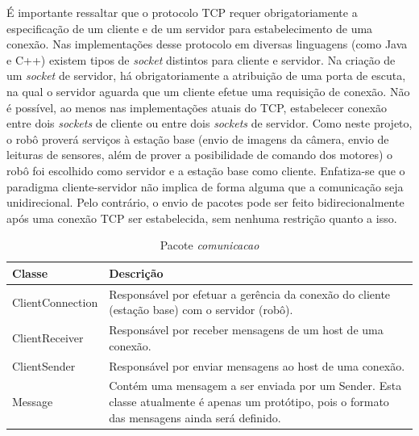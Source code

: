 É importante ressaltar que o protocolo TCP requer obrigatoriamente a especificação de um cliente e de um servidor para estabelecimento de uma conexão. Nas implementações desse protocolo em diversas linguagens (como Java e C++) existem tipos de \textit{socket} distintos para cliente e servidor. Na criação de um \textit{socket} de servidor, há obrigatoriamente a atribuição de uma porta de escuta, na qual o servidor aguarda que um cliente efetue uma requisição de conexão. Não é possível, ao menos nas implementações atuais do TCP, estabelecer conexão entre dois \textit{sockets} de cliente ou entre dois \textit{sockets} de servidor. Como neste projeto, o robô proverá serviços à estação base (envio de imagens da câmera, envio de leituras de sensores, além de prover a posibilidade de comando dos motores) o robô foi escolhido como servidor e a estação base como cliente. Enfatiza-se que o paradigma cliente-servidor não implica de forma alguma que a comunicação seja unidirecional. Pelo contrário, o envio de pacotes pode ser feito bidirecionalmente após uma conexão TCP ser estabelecida, sem nenhuma restrição quanto a isso.

\begin{table}[h]
  \centering
  \caption{Pacote \textit{comunicacao}}
    \begin{tabular}{p{6cm}p{8cm}}
    \toprule
    \textbf{Classe} & \textbf{Descrição} \\ 
    \midrule
    ClientConnection & Responsável por efetuar a gerência da conexão do cliente (estação base) com o servidor (robô). \\ \hline
    ClientReceiver & Responsável por receber mensagens de um host de uma conexão. \\ \hline
    ClientSender & Responsável por enviar mensagens ao host de uma conexão. \\ \hline
    Message & Contém uma mensagem a ser enviada por um Sender. Esta classe atualmente é apenas um protótipo, pois o formato das mensagens ainda será definido. \\ 
    \bottomrule
    \end{tabular}%
  \label{tab:pacote_comunicacao}%
\end{table}%

